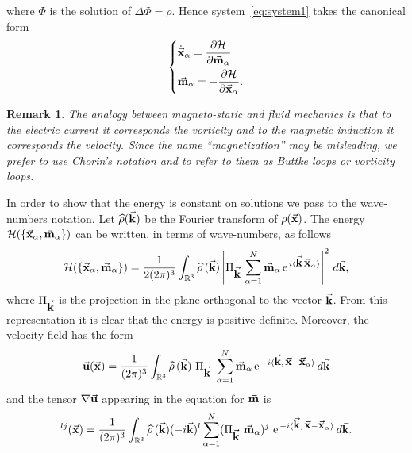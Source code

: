 \documentclass[a4paper,11pt]{article}
\numberwithin{equation}{section}
\newtheorem{remark}{Remark}
\newcommand{\R}{\mathbb{R}}
\newcommand{\la}{\langle}
\newcommand{\ra}{\rangle}
\newcommand{\U}{\mbox{$\vec{\bf u}$}}
\renewcommand{\k}{\mbox{$\vec{\bf k}$}}
\newcommand{\x}{\mbox{$\vec{\bf x}$}}
\newcommand{\m}{\mbox{$\vec{\bf m}$}}
\begin{document}
where $\Phi$ is the solution of $\Delta\Phi=\rho$. Hence
system~\eqref{eq:system1} takes the canonical form  
\begin{equation*}
\left\{\begin{aligned}
&{\dot{\x}}_\alpha=\frac{\partial \mathcal{H}}{\partial\m_\alpha}
\\
&{\dot{\m}}_\alpha=-\frac{\partial \mathcal{H}}{\partial {\x}_\alpha}.
       \end{aligned}
\right.
\end{equation*}
\begin{remark}
The analogy between magneto-static and fluid mechanics is that to the
electric current it corresponds the vorticity and to the magnetic
induction it corresponds the velocity. Since the name
``magnetization'' may be misleading, we prefer to use Chorin's
notation and to refer to them as Buttke loops or vorticity loops.  
\end{remark}
In order to show that the energy is constant on solutions we pass to
the wave-numbers notation. Let $\widehat\rho(\k)$ be the Fourier
transform of $\rho(\x)$. The energy
$\mathcal{H}(\{\x_\alpha,\m_\alpha\})$ can be written, in terms of
wave-numbers, as follows 
\begin{equation*}%
\mathcal{H}(\{\x_\alpha,\m_\alpha\}) = \frac{1}{2(2\pi)^3}\int_{\R^3}
\widehat{\rho}\,(\k) 
\left|\Pi_{\k}\, \sum_{\alpha=1}^N \m_\alpha
\,\text{e}^{\,i\la\k\,\x_\alpha\ra} \right|^2\,d\k,
\end{equation*}
where $\Pi_{\k}$ is the projection in the plane orthogonal to the
vector $\k$. From this representation it is clear that the energy is
positive definite. Moreover, the velocity field has the form
\begin{equation*}%
\U(\x) = \frac{1}{(2\pi)^3}\int_{\R^3} \widehat{\rho}\,(\k)\
\Pi_{\k}\ \sum_{\alpha=1}^N  
\m_\alpha\, \text{e}^{\,-i\la\k,\,\x-\x_\alpha\ra}\, d\k
\end{equation*}
and the tensor $\nabla\U$ appearing in the equation for $\m$ is
\begin{equation*}%
[\nabla \U]^{lj}(\x)=\frac{1}{(2\pi)^3}\int_{\R^3}
\widehat{\rho}\,(\k) (-i\k)^l   
\sum_{\alpha=1}^N (\Pi_{\k}\ \m_\alpha)^j
\ \text{e}^{\,-i\la\k,\,\x-\x_\alpha\ra}\, d\k.    
\end{equation*}
\end{document}
